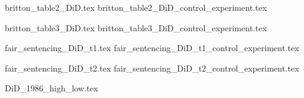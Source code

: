 \documentclass{article}
\begin{document}
{britton_table2_DiD.tex}
{britton_table2_DiD_control_experiment.tex}

{britton_table3_DiD.tex}
{britton_table3_DiD_control_experiment.tex}

{fair_sentencing_DiD_t1.tex}
{fair_sentencing_DiD_t1_control_experiment.tex}

{fair_sentencing_DiD_t2.tex}
{fair_sentencing_DiD_t2_control_experiment.tex}

{DiD_1986_high_low.tex}



\clearpage
\nocite{*}
\singlespacing




\clearpage
\end{document}
